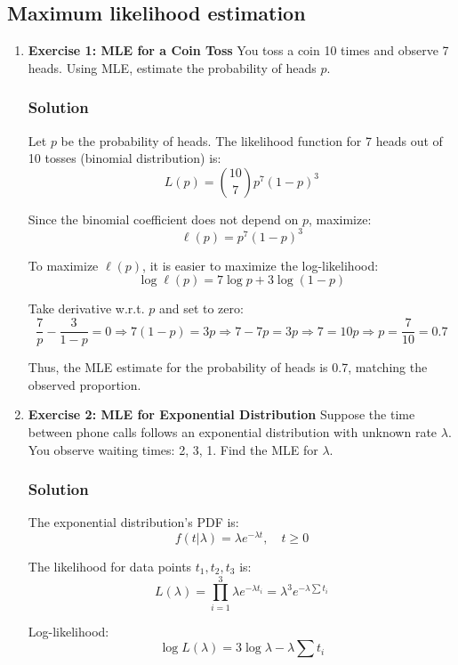 \documentclass{book}
\begin{document}
\newpage

\subsection*{Maximum likelihood estimation}

\begin{enumerate}

	\item \textbf{Exercise 1: MLE for a Coin Toss}
	You toss a coin 10 times and observe 7 heads. Using MLE, estimate the probability of heads $p$.

	\subsubsection*{Solution}
	Let $p$ be the probability of heads. The likelihood function for 7 heads out of 10 tosses (binomial distribution) is:
	\[
	L(p) = \binom{10}{7} p^7 (1-p)^3
	\]

	Since the binomial coefficient does not depend on $p$, maximize:
	\[
	\ell(p) = p^7 (1-p)^3
	\]

	To maximize $\ell(p)$, it is easier to maximize the log-likelihood:
	\[
	\log \ell(p) = 7 \log p + 3 \log (1-p)
	\]

	Take derivative w.r.t. $p$ and set to zero:
	\[
	\frac{7}{p} - \frac{3}{1-p} = 0
	\Rightarrow 7(1-p) = 3p
	\Rightarrow 7 - 7p = 3p
	\Rightarrow 7 = 10p
	\Rightarrow p = \frac{7}{10} = 0.7
	\]

	Thus, the MLE estimate for the probability of heads is 0.7, matching the observed proportion.

	\item \textbf{Exercise 2: MLE for Exponential Distribution}
	Suppose the time between phone calls follows an exponential distribution with unknown rate $\lambda$. You observe waiting times: 2, 3, 1. Find the MLE for $\lambda$.

	\subsubsection*{Solution}
	The exponential distribution’s PDF is:
	\[
	f(t|\lambda) = \lambda e^{-\lambda t}, \quad t \geq 0
	\]

	The likelihood for data points $t_1, t_2, t_3$ is:
	\[
	L(\lambda) = \prod_{i=1}^3 \lambda e^{-\lambda t_i} = \lambda^3 e^{-\lambda \sum t_i}
	\]

	Log-likelihood:
	\[
	\log L(\lambda) = 3 \log \lambda - \lambda \sum t_i
	\]


\end{enumerate}
\end{document}

